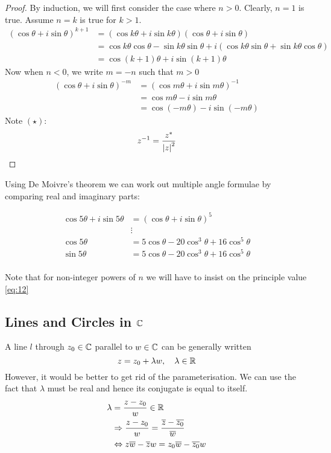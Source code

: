 \documentclass{article}
\numberwithin{equation}{section}
\begin{document}
\begin{proof}
    By induction, we will first consider the case where $n > 0$. Clearly, $n=1$ is true. Assume $n=k$ is true for $k > 1$.
    \begin{align*}
        (\cos{\theta} + i\sin{\theta})^{k+1} &= (\cos{k\theta} + i\sin{k\theta})(\cos{\theta} + i\sin{\theta}) \\
        &= \cos{k\theta}\cos{\theta} - \sin{k\theta}\sin{\theta} + i(\cos{k\theta}\sin{\theta} + \sin{k\theta}\cos{\theta}) \\
        &= \cos{(k+1)\theta} + i\sin{(k+1)\theta}
    \end{align*}
    Now when $n < 0$, we write $m = -n$ such that $m > 0$
    \begin{align*}
        (\cos{\theta} + i\sin{\theta})^{-m} &= (\cos{m\theta} + i\sin{m\theta})^{-1} \\
        &= \cos{m\theta} - i\sin{m\theta} \tag{by ($\star$)}\\
        &= \cos{(-m\theta)} - i\sin{(-m\theta)}
    \end{align*}
    Note $(\star)$:
    \[
        z^{-1} = \frac{z^*}{\left\lvert z\right\rvert^2}    
    \]
\end{proof}

Using De Moivre's theorem we can work out multiple angle formulae by comparing real and imaginary parts:
\begin{eg}
    \begin{align*}
        \cos{5 \theta} + i\sin{5 \theta} &= (\cos{\theta} + i\sin{\theta})^5 \\
        &\vdots \\
        \cos{5 \theta} &= 5\cos{\theta} - 20 \cos^3{\theta} + 16\cos^5{\theta}\\
        \sin{5 \theta} &= 5\cos{\theta} - 20 \cos^3{\theta} + 16\cos^5{\theta}\\
    \end{align*}
\end{eg}
Note that for non-integer powers of $n$ we will have to insist on the principle value \eqref{eq:12}

\subsection{Lines and Circles in $\mathbb{C}$}
\begin{defi}
    A line $l$ through $z_0 \in \mathbb{C}$ parallel to $w \in \mathbb{C}$ can be generally written
    \[
        z = z_0 + \lambda w, \quad \lambda \in \mathbb{R}    
    \]
    However, it would be better to get rid of the parameterisation. We can use the fact that $\lambda$ must be real and hence its conjugate is equal to itself.
    \begin{align*}
        \lambda &= \frac{z - z_0}{w} \in \mathbb{R}\\
        &\Rightarrow \frac{z - z_0}{w} = \frac{\overline{z} - \overline{z_0}}{\overline{w}} \\
        &\Leftrightarrow z \overline{w} - \overline{z}w = z_0 \overline{w} - \overline{z_0} w
    \end{align*}
\end{defi}
\end{document}
